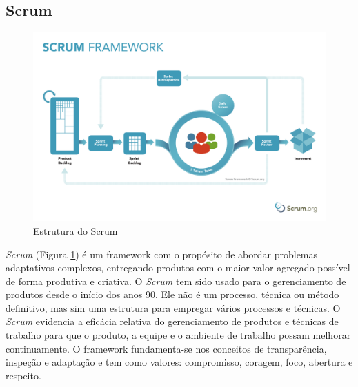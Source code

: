 \subsection{Scrum}
\begin{figure}
    \centering
    \includegraphics[width=\textwidth]{pfc/figuras/scrum.pdf}
    \caption{Estrutura do Scrum}
    \label{fig:scrum}
\end{figure}

\textit{Scrum} (Figura \ref{fig:scrum})  é um framework com o propósito de abordar problemas adaptativos complexos, entregando produtos com o maior valor agregado possível de forma produtiva e criativa. O \textit{Scrum} tem sido usado para o gerenciamento de produtos desde o início dos anos 90. Ele não é um processo, técnica ou método definitivo, mas sim uma estrutura para empregar vários processos e técnicas. O \textit{Scrum} evidencia a eficácia relativa do gerenciamento de produtos e técnicas de trabalho para que o produto, a equipe e o ambiente de trabalho possam melhorar continuamente. O framework fundamenta-se nos conceitos de transparência, inspeção e adaptação e tem como valores: compromisso, coragem, foco, abertura e respeito.

